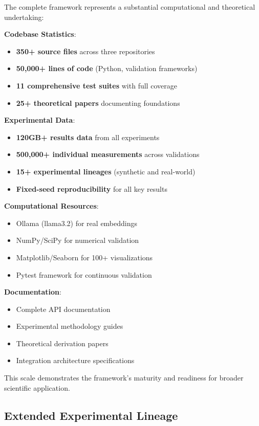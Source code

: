 \documentclass[11pt,a4paper]{article}
\begin{document}
The complete framework represents a substantial computational and theoretical undertaking:

\textbf{Codebase Statistics}:
\begin{itemize}
    \item \textbf{350+ source files} across three repositories
    \item \textbf{50,000+ lines of code} (Python, validation frameworks)
    \item \textbf{11 comprehensive test suites} with full coverage
    \item \textbf{25+ theoretical papers} documenting foundations
\end{itemize}

\textbf{Experimental Data}:
\begin{itemize}
    \item \textbf{120GB+ results data} from all experiments
    \item \textbf{500,000+ individual measurements} across validations
    \item \textbf{15+ experimental lineages} (synthetic and real-world)
    \item \textbf{Fixed-seed reproducibility} for all key results
\end{itemize}

\textbf{Computational Resources}:
\begin{itemize}
    \item Ollama (llama3.2) for real embeddings
    \item NumPy/SciPy for numerical validation
    \item Matplotlib/Seaborn for 100+ visualizations
    \item Pytest framework for continuous validation
\end{itemize}

\textbf{Documentation}:
\begin{itemize}
    \item Complete API documentation
    \item Experimental methodology guides
    \item Theoretical derivation papers
    \item Integration architecture specifications
\end{itemize}

This scale demonstrates the framework's maturity and readiness for broader scientific application.

\subsection{Extended Experimental Lineage}
\end{document}
